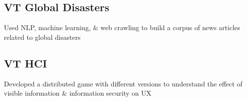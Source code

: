 \documentclass[]{resume}
\begin{document}
\begin{minipage}[t]{0.35\textwidth}
\begin{grayhighlight}
\subsection{VT Global Disasters}
\begin{tightemize}
\item Used NLP, machine learning, \& web crawling to build a corpus of news articles related to global disasters
\end{tightemize}

\subsection{VT HCI}
\begin{tightemize}
\item Developed a distributed game with different versions to understand the effect of visible information \& information security on UX
\end{tightemize}






\end{grayhighlight}

%
%

\end{minipage} 
\end{document}
